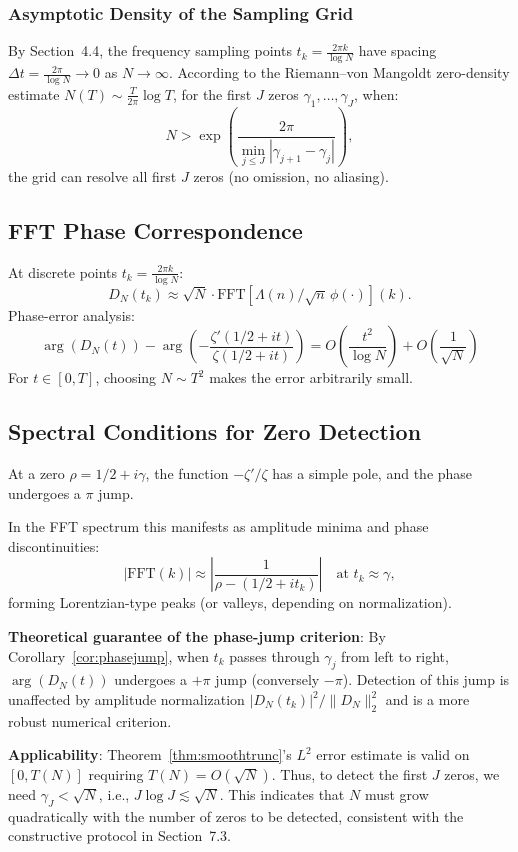\documentclass[12pt,a4paper]{amsart}
\theoremstyle{plain}
\theoremstyle{definition}
\theoremstyle{remark}
\begin{document}
\subsubsection{Asymptotic Density of the Sampling Grid}

By Section~4.4, the frequency sampling points $t_k = \frac{2\pi k}{\log N}$ have spacing $\Delta t = \frac{2\pi}{\log N}\to 0$ as $N\to\infty$. According to the Riemann--von Mangoldt zero-density estimate $N(T) \sim \frac{T}{2\pi}\log T$, for the first $J$ zeros $\gamma_1,\dots,\gamma_J$, when:
\[
N > \exp\left(\frac{2\pi}{\min_{j\leq J} |\gamma_{j+1}-\gamma_j|}\right),
\]
the grid can resolve all first $J$ zeros (no omission, no aliasing).

\subsection{FFT Phase Correspondence}

At discrete points $t_k=\frac{2\pi k}{\log N}$:
\[
D_N(t_k) \approx \sqrt{N}\cdot \mathrm{FFT}[\Lambda(n)/\sqrt{n}\,\phi(\cdot)](k).
\]
Phase-error analysis:
\[
\arg(D_N(t)) - \arg\left(-\frac{\zeta'(1/2+it)}{\zeta(1/2+it)}\right) = O\left(\frac{t^2}{\log N}\right) + O\left(\frac{1}{\sqrt{N}}\right)
\]
For $t \in [0, T]$, choosing $N \sim T^2$ makes the error arbitrarily small.

\subsection{Spectral Conditions for Zero Detection}

At a zero $\rho = 1/2 + i\gamma$, the function $-\zeta'/\zeta$ has a simple pole, and the phase undergoes a $\pi$ jump.

In the FFT spectrum this manifests as amplitude minima and phase discontinuities:
\[
|\mathrm{FFT}(k)| \approx \left| \frac{1}{\rho - (1/2+it_k)} \right| \quad \text{at } t_k \approx \gamma,
\]
forming Lorentzian-type peaks (or valleys, depending on normalization).

\textbf{Theoretical guarantee of the phase-jump criterion}:
By Corollary~\ref{cor:phasejump}, when $t_k$ passes through $\gamma_j$ from left to right, $\arg(D_N(t))$ undergoes a $+\pi$ jump (conversely $-\pi$). Detection of this jump is unaffected by amplitude normalization $|D_N(t_k)|^2/\|D_N\|_2^2$ and is a more robust numerical criterion.

\textbf{Applicability}: Theorem~\ref{thm:smoothtrunc}'s $L^2$ error estimate is valid on $[0,T(N)]$ requiring $T(N) = O(\sqrt{N})$. Thus, to detect the first $J$ zeros, we need $\gamma_J < \sqrt{N}$, i.e., $J \log J \lesssim \sqrt{N}$. This indicates that $N$ must grow quadratically with the number of zeros to be detected, consistent with the constructive protocol in Section~7.3.
\end{document}
